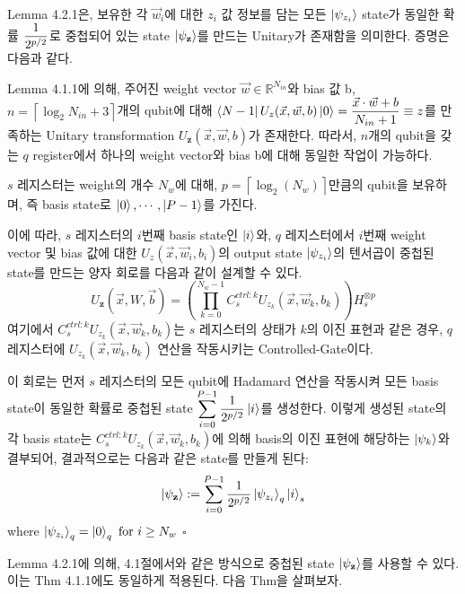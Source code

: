 Lemma 4.2.1은, 보유한 각 \(\vec{w}_i\)에 대한 \(\displaystyle {z}_i\) 값 정보를 담는 모든 \(\ket{\psi_{z_i}}\) state가 동일한 확률 \(\displaystyle {1 \over {2^{p/2}}}\)로 중첩되어 있는 state \(\ket{\psi_{\mathbf z}}\)를 만드는 Unitary가 존재함을 의미한다. 증명은 다음과 같다.

\begin{pf} 
    Lemma 4.1.1에 의해, 주어진 weight vector $\vec{w} \in \mathbb{R}^{N_{in}}$와 bias 값 b, \(n = \left\lceil \log_2{N_{in}} + 3 \right\rceil\)개의 qubit에 대해 \(\displaystyle \bra{N-1}U_z(\vec{x},\vec{w},b)\ket{0} = \frac{\vec{x}\cdot \vec{w}+b}{N_{in}+1} \equiv z\)를 만족하는 Unitary transformation \(U_{\mathbf z}(\vec{x},\vec{w},b)\)가 존재한다. 따라서, $n$개의 qubit을 갖는 $q$ register에서 하나의 weight vector와 bias b에 대해 동일한 작업이 가능하다.

    $s$ 레지스터는 weight의 개수 \(N_w\)에 대해, \(p = \left\lceil \log_2(N_w) \right\rceil\)만큼의 qubit을 보유하며, 즉 basis state로 \(\ket{0}, \cdots, \ket{P-1}\)를 가진다.

    이에 따라, \(s\) 레지스터의 \(i\)번째 basis state인 \(\ket{i}\)와, \(q\) 레지스터에서 \(i\)번째 weight vector 및 bias 값에 대한 \(U_z(\vec{x}, \vec{w}_i, b_i)\)의 output state \(\ket{\psi_{z_i}}\)의 텐서곱이 중첩된 state를 만드는 양자 회로를 다음과 같이 설계할 수 있다.
    \[
        U_{\mathbf z}(\vec{x}, W, \vec{b}) = \left(\prod_{k=0}^{N_w-1}C_{s}^{ctrl : k}U_{z_k}(\vec{x}, \vec{w}_k, b_k)\right) H_s^{\otimes p}
    \]
    여기에서 \(C_{s}^{ctrl:k}U_{z_k}(\vec{x}, \vec{w}_k, b_k)\)는 \(s\) 레지스터의 상태가 \(k\)의 이진 표현과 같은 경우, \(q\) 레지스터에 \(U_{z_k}(\vec{x}, \vec{w}_k, b_k)\) 연산을 작동시키는 Controlled-Gate이다.

    이 회로는 먼저 \(s\) 레지스터의 모든 qubit에 Hadamard 연산을 작동시켜 모든 basis state이 동일한 확률로 중첩된 state \(\displaystyle \sum_{i=0}^{P-1} {1\over {2^{p/2}}}\ket{i}\)를 생성한다. 이렇게 생성된 state의 각 basis state는 \(C_{s}^{ctrl:k}U_{z_k}(\vec{x}, \vec{w}_k, b_k)\)에 의해 basis의 이진 표현에 해당하는 $\ket{\psi_k}$와 결부되어, 결과적으로는 다음과 같은 state를 만들게 된다:
    \[
        \ket{\psi_{\mathbf{z}}} := \sum_{i=0}^{P-1} {1\over {2^{p/2}}} \ket{\psi_{z_i}}_q \ket{i}_s 
    \]
    where \(\ket{\psi_{z_i}}_q = \ket{0}_q \text{ for } i \ge N_w\) \quad $\square$
\end{pf}

Lemma 4.2.1에 의해, 4.1절에서와 같은 방식으로 중첩된 state \(\ket{\psi_{\mathbf z}}\)를 사용할 수 있다. 이는 Thm 4.1.1에도 동일하게 적용된다. 다음 Thm을 살펴보자.

